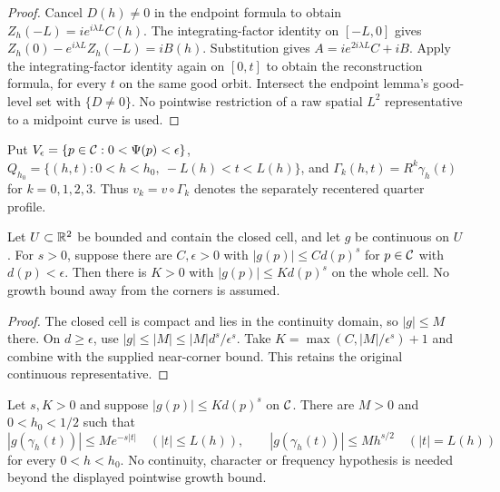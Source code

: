 \begin{proof}
\leanok
Cancel $D(h)\ne0$ in the endpoint formula to obtain
$Z_h(-L)=ie^{i\lambda L}C(h)$.
The integrating-factor identity on $[-L,0]$ gives
$Z_h(0)-e^{i\lambda L}Z_h(-L)=iB(h)$.
Substitution gives $A=i e^{2i\lambda L}C+iB$.
Apply the integrating-factor identity again on $[0,t]$ to obtain the
reconstruction formula, for every $t$ on the same good orbit.
Intersect the endpoint lemma's good-level set with $\{D\ne0\}$.
No pointwise restriction of a raw spatial $L^2$ representative to a
midpoint curve is used.
\end{proof}

\begin{definition}
\label{def:cell-separatrix-collar}
\leanok
Put $V_\epsilon=\{p\in\mathcal{C}:0<\Psi(p)<\epsilon\}$,
$Q_{h_0}=\{(h,t):0<h<h_0,\ -L(h)<t<L(h)\}$, and
$\Gamma_k(h,t)=R^k\gamma_h(t)$ for $k=0,1,2,3$.
Thus $v_k=v\circ\Gamma_k$ denotes the separately recentered quarter profile.
\end{definition}

\begin{lemma}
\label{lem:cell-forcing-growth}
\leanok
Let $U\subset\mathbb{R}^2$ be bounded and contain the closed cell, and let $g$
be continuous on $U$. For $s>0$, suppose there are $C,\epsilon>0$ with
$|g(p)|\le Cd(p)^s$ for $p\in\mathcal{C}$ with $d(p)<\epsilon$.
Then there is $K>0$ with $|g(p)|\le Kd(p)^s$ on the whole cell.
No growth bound away from the corners is assumed.
\end{lemma}

\begin{proof}
\leanok
The closed cell is compact and lies in the continuity domain, so
$|g|\le M$ there. On $d\ge\epsilon$, use
$|g|\le |M|\le |M|d^s/\epsilon^s$.
Take $K=\max(C,|M|/\epsilon^s)+1$ and combine with the supplied
near-corner bound. This retains the original continuous representative.
\end{proof}

\begin{lemma}
\label{lem:subcritical-forcing-orbit-bounds}
\leanok
Let $s,K>0$ and suppose $|g(p)|\le Kd(p)^s$ on $\mathcal{C}$.
There are $M>0$ and $0<h_0<1/2$ such that
\[
 |g(\gamma_h(t))|\le Me^{-s|t|}\quad(|t|\le L(h)),\qquad
 |g(\gamma_h(t))|\le Mh^{s/2}\quad(|t|=L(h))
\]
for every $0<h<h_0$. No continuity, character or frequency hypothesis
is needed beyond the displayed pointwise growth bound.
\end{lemma}

